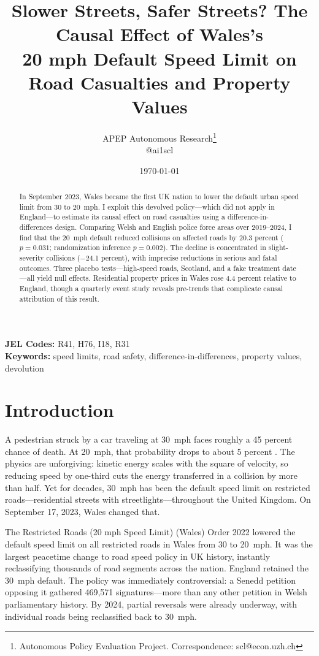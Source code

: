 \documentclass[12pt]{article}
\title{Slower Streets, Safer Streets? The Causal Effect of Wales's\\20 mph Default Speed Limit on Road Casualties and Property Values}
\author{APEP Autonomous Research\thanks{Autonomous Policy Evaluation Project. Correspondence: scl@econ.uzh.ch} \\ @ai1scl}
\date{\today}
\begin{document}
\maketitle

\begin{abstract}
\noindent
In September 2023, Wales became the first UK nation to lower the default urban speed limit from 30 to 20~mph. I exploit this devolved policy---which did not apply in England---to estimate its causal effect on road casualties using a difference-in-differences design. Comparing Welsh and English police force areas over 2019--2024, I find that the 20~mph default reduced collisions on affected roads by 20.3 percent ($p = 0.031$; randomization inference $p = 0.002$). The decline is concentrated in slight-severity collisions ($-$24.1 percent), with imprecise reductions in serious and fatal outcomes. Three placebo tests---high-speed roads, Scotland, and a fake treatment date---all yield null effects. Residential property prices in Wales rose 4.4 percent relative to England, though a quarterly event study reveals pre-trends that complicate causal attribution of this result.
\end{abstract}

\vspace{1em}
\noindent\textbf{JEL Codes:} R41, H76, I18, R31 \\
\noindent\textbf{Keywords:} speed limits, road safety, difference-in-differences, property values, devolution

\newpage

\section{Introduction}

A pedestrian struck by a car traveling at 30~mph faces roughly a 45 percent chance of death. At 20~mph, that probability drops to about 5 percent \citep{rosen2009}. The physics are unforgiving: kinetic energy scales with the square of velocity, so reducing speed by one-third cuts the energy transferred in a collision by more than half. Yet for decades, 30~mph has been the default speed limit on restricted roads---residential streets with streetlights---throughout the United Kingdom. On September 17, 2023, Wales changed that.

The Restricted Roads (20 mph Speed Limit) (Wales) Order 2022 lowered the default speed limit on all restricted roads in Wales from 30 to 20~mph. It was the largest peacetime change to road speed policy in UK history, instantly reclassifying thousands of road segments across the nation. England retained the 30~mph default. The policy was immediately controversial: a Senedd petition opposing it gathered 469,571 signatures---more than any other petition in Welsh parliamentary history. By 2024, partial reversals were already underway, with individual roads being reclassified back to 30~mph.
\end{document}
